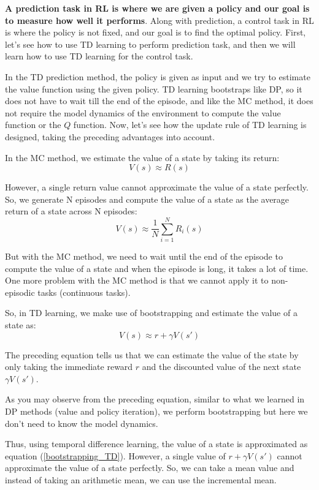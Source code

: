 {\bf A prediction task in RL is where we are given a policy and our goal is 
to measure how well it performs}. Along with prediction, a control task in 
RL is where the policy is not fixed, and our goal is to find the optimal 
policy. First, let's see how to use TD learning to perform prediction task, 
and then we will learn how to use TD learning for the control task. 

In the TD prediction method, the policy is given as input and we try to 
estimate the value function using the given policy. TD learning bootstraps 
like DP, so it does not have to wait till the end of the episode, and like 
the MC method, it does not require the model dynamics of the environment 
to compute the value function or the $Q$ function. Now, let's see how the 
update rule of TD learning is designed, taking the preceding advantages 
into account.

In the MC method, we estimate the value of a state by taking its return:  
$$
V(s) \approx R(s)
$$

However, a single return value cannot approximate the value of a state 
perfectly. So, we generate N episodes and compute the value of a state 
as the average return of a state across N episodes:
$$
V(s) \approx \frac{1}{N} \sum_{i=1}^{N} R_i(s)
$$

But with the MC method, we need to wait until the end of the episode to 
compute the value of a state and when the episode is long, it takes a 
lot of time. One more problem with the MC method is that we cannot apply 
it to non-episodic tasks (continuous tasks).  

So, in TD learning, we make use of bootstrapping and estimate the value 
of a state as:
\begin{equation}\label{bootstrapping_TD}
V(s) \approx r + \gamma V(s')
\end{equation}

The preceding equation tells us that we can estimate the value of the 
state by only taking the immediate reward $r$ and the discounted value 
of the next state $\gamma V(s')$.

As you may observe from the preceding equation, similar to what we learned 
in DP methods (value and policy iteration), we perform bootstrapping but 
here we don't need to know the model dynamics.  

Thus, using temporal difference learning, the value of a state is 
approximated as equation (\ref{bootstrapping_TD}). However, a single value 
of $r + \gamma V(s')$ cannot approximate the value of a state perfectly. 
So, we can take a mean value and instead of taking an arithmetic mean, 
we can use the incremental mean.  

